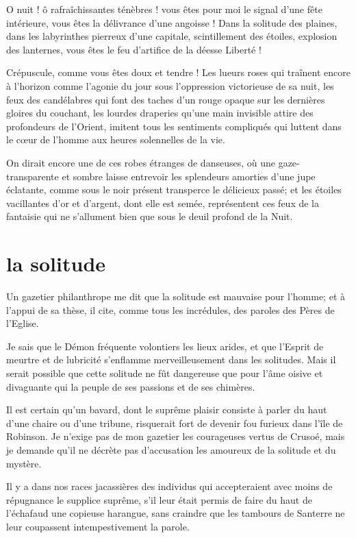 O nuit ! ô rafraîchissantes ténèbres ! vous êtes pour moi le signal
d’une fête intérieure, vous êtes la délivrance
d’une angoisse ! Dans la solitude des plaines, dans
les labyrinthes pierreux d’une capitale, scintillement
des étoiles, explosion des lanternes, vous êtes le feu
d’artifice de la déesse Liberté !

Crépuscule, comme vous êtes doux et tendre ! Les lueurs roses qui
traînent encore à l’horizon comme
l’agonie du jour sous l’oppression
victorieuse de sa nuit, les feux des candélabres qui font des taches
d’un rouge opaque sur les dernières gloires du
couchant, les lourdes draperies qu’une main invisible
attire des profondeurs de l’Orient, imitent tous les
sentiments compliqués qui luttent dans le c\oe ur de
l’homme aux heures solennelles de la vie.

On dirait encore une de ces robes étranges de danseuses, où une gaze{}-
transparente et sombre laisse entrevoir les splendeurs amorties
d’une jupe éclatante, comme sous le noir présent
transperce le délicieux passé; et les étoiles vacillantes
d’or et d’argent, dont elle est
semée, représentent ces feux de la fantaisie qui ne
s’allument bien que sous le deuil profond de la Nuit.

\quebra\section[La solitude]{la solitude }

Un gazetier philanthrope me dit que la solitude est mauvaise pour
l’homme; et à l’appui de sa thèse, il
cite, comme tous les incrédules, des paroles des Pères de
l’Eglise.

Je sais que le Démon fréquente volontiers les lieux arides, et que
l’Esprit de meurtre et de lubricité
s’enflamme merveilleusement dans les solitudes. Mais
il serait possible que cette solitude ne fût dangereuse que pour
l’âme oisive et divaguante qui la peuple de ses
passions et de ses chimères.

Il est certain qu’un bavard, dont le suprême plaisir
consiste à parler du haut d’une chaire ou
d’une tribune, risquerait fort de devenir fou furieux
dans l’île de Robinson. Je n’exige
pas de mon gazetier les courageuses vertus de Crusoé, mais je demande
qu’il ne décrète pas d’accusation les
amoureux de la solitude et du mystère.

Il y a dans nos races jacassières des individus qui accepteraient avec
moins de répugnance le supplice suprême, s’il leur
était permis de faire du haut de l’échafaud une
copieuse harangue, sans craindre que les tambours de Santerre ne leur
coupassent intempestivement la parole.


